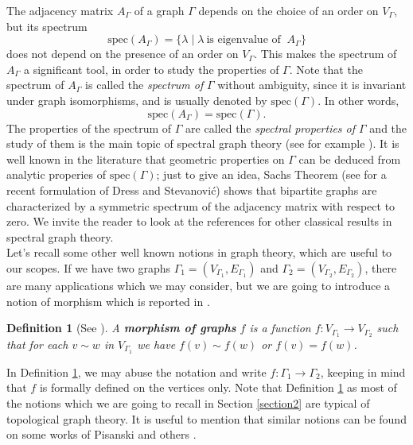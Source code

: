\documentclass{amsart}
\newtheorem{defn}[theo]{Definition}
\theoremstyle{definition}
\numberwithin{equation}{section}
\begin{document}
The adjacency matrix $A_\Gamma$  of a graph $\Gamma$  depends  on the choice of an order on  $V_\Gamma$, but its spectrum 
\begin{equation} \mathrm{spec}(A_\Gamma)=\{\lambda \mid \lambda \ \mbox{is eigenvalue of } \ A_\Gamma\}  \end{equation}
does not depend on the presence of an order on $V_\Gamma$. This makes the spectrum of $A_\Gamma$ a significant tool, in order to study the properties of $\Gamma$. Note that the spectrum of $A_\Gamma$ is called the \textit{spectrum of } $\Gamma$  without ambiguity, since it is invariant under graph isomorphisms, and is usually denoted by $\mathrm{spec}(\Gamma)$. In other words, 
\begin{equation} \mathrm{spec}(A_\Gamma)=\mathrm{spec}(\Gamma).\end{equation}
The properties of the spectrum of $\Gamma$ are called the \textit{spectral properties of $\Gamma$} and the study of them is the main topic of spectral graph theory (see for example \cite{spectrabook, crs}). It is well known in the literature that geometric properties on $\Gamma$ can be deduced from analytic properies of $\mathrm{spec}(\Gamma)$; just to give an idea,  Sachs Theorem (see  \cite{dragan1} for a recent formulation of Dress and Stevanovi\'c) shows that bipartite  graphs are characterized by a symmetric spectrum of the adjacency matrix  with respect to zero. We invite the reader to look at the references \cite{spectrabook, crs} for other classical results in spectral graph theory.
\\
Let's recall some other well known notions in graph theory, which are useful to our scopes. If we have two graphs $\Gamma_1 = (V_{\Gamma_1}, E_{\Gamma_1})$ and $\Gamma_2 = (V_{\Gamma_2}, E_{\Gamma_2})$, there are many applications which we may consider, but we are going to introduce a notion of morphism which is reported in \cite{larrion}.
\begin{defn}[See \cite{larrion}]\label{morphism}
A \textbf{morphism of graphs} $f$ is a function $f:V_{\Gamma_1} \longrightarrow V_{\Gamma_2}$ such that for each $v \sim w$ in $V_{\Gamma_1}$ we have $f(v) \sim f(w)$ or $f(v) = f(w)$. 
\end{defn}
In Definition \ref{morphism}, we may abuse the notation and 
write $f: \Gamma_1 \longrightarrow \Gamma_2$, keeping in mind that $f$ is formally defined on the vertices only. Note that Definition \ref{morphism} as most of the notions which we are going to recall in Section \ref{section2} are typical of topological graph theory. It is useful to mention that similar notions can be found on some works of Pisanski and others \cite{Pisanski, lessico}.
\end{document}
